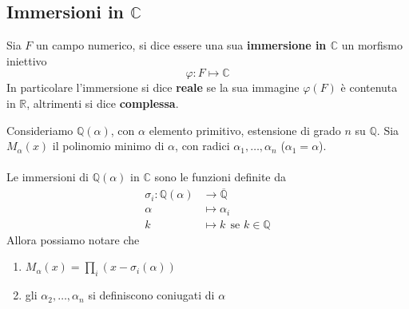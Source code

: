 \subsection{Immersioni in $\mathbb{C}$}
\begin{definizione}
	Sia $F$ un campo numerico, si dice essere una sua \textbf{immersione in $\mathbb{C}$} un morfismo iniettivo 
	\begin{equation*}
	\varphi: F \longmapsto \mathbb{C}
	\end{equation*}
	In particolare l'immersione si dice \textbf{reale} se la sua immagine $\varphi(F)$ è contenuta in $\mathbb{R}$, altrimenti si dice \textbf{complessa}.
\end{definizione}
\begin{osservazione}
	Consideriamo $\mathbb{Q}(\alpha)$, con $\alpha$ elemento primitivo, estensione di grado $n$ su $\mathbb{Q}$. Sia $M_\alpha(x)$ il polinomio minimo di $\alpha$, con radici $\alpha_1,\dots,\alpha_n$ ($\alpha_1=\alpha$). \\ \\ Le immersioni di $\mathbb{Q}(\alpha)$ in $\mathbb{C}$ sono le funzioni definite da 
	\begin{align*}
	\sigma_i:\mathbb{Q}(\alpha)&\longrightarrow \overline{\mathbb{Q}}\\
	\alpha&\longmapsto\alpha_i\\
	k&\longmapsto k \ \ \text{se $k\in\mathbb{Q}$}
	\end{align*}
	Allora possiamo notare che 
	\begin{enumerate}
		\item $M_\alpha(x)=\prod_i\left(x-\sigma_i(\alpha)\right)$
		\item gli $\alpha_2,\dots,\alpha_n$ si definiscono coniugati di $\alpha$ 
	\end{enumerate}
\end{osservazione}

